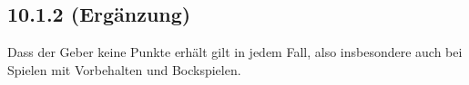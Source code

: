 \subsection*{10.1.2 (Ergänzung)}

Dass der Geber keine Punkte erhält gilt in jedem Fall, also insbesondere auch
bei Spielen mit Vorbehalten und Bockspielen.












